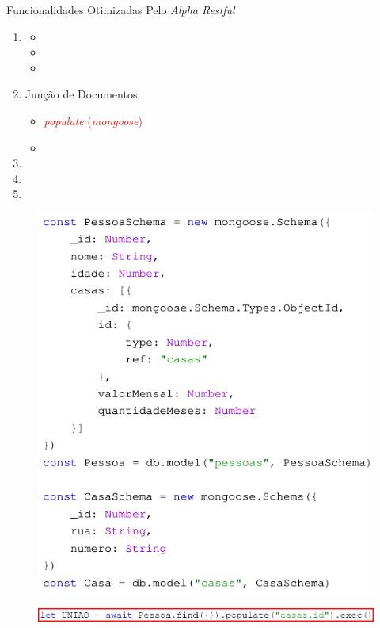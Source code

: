 \documentclass{beamer} %
\begin{document}
\begin{frame}{Funcionalidades Otimizadas Pelo \textit{Alpha Restful}}
    \begin{enumerate}
        \item {}
            \begin{itemize}
                \item {}
                \item {}
                \item {}
            \end{itemize}
        \item Junção de Documentos
            \begin{itemize}
                \item \textcolor{red}{\textit{populate} (\textit{mongoose})}
                \item {}
            \end{itemize}
        \item {}
        \item {}
        \item {}
    \end{enumerate}
\end{frame}

\begin{frame}
    \begin{figure}
        \centering
        \includegraphics[width=0.6\linewidth]{imagens/schema-mongoose.png}
        \label{fig:schema-mongoose}
    \end{figure}
    
    \begin{figure}
        \centering
        \includegraphics[width=\linewidth]{imagens/populate-mongoose.png}
        \label{fig:populate-mongoose}
    \end{figure}
\end{frame}
\end{document}

